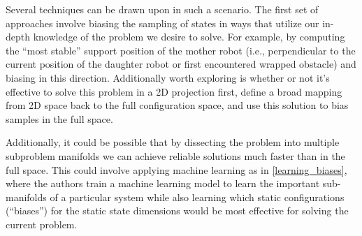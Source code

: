 \documentclass[12pt]{article}
\begin{document}
Several techniques can be drawn upon in such a scenario. The first set of approaches involve biasing the sampling of states 
in ways that utilize our in-depth knowledge of the problem we desire to solve. For example, by computing the ``most stable'' support 
position of the mother robot (i.e., perpendicular to the current position of the daughter robot or first encountered wrapped obstacle) 
and biasing in this direction. Additionally worth exploring is whether or not it's effective to solve this problem in 
a 2D projection first, define a broad mapping from 2D space back to the full configuration space, and use this solution to bias samples
in the full space. 

Additionally, it could be possible that by dissecting the problem into multiple subproblem manifolds we can achieve reliable 
solutions much faster than in the full space. This could involve applying machine learning as in \ref{learning_biases}, where the authors 
train a machine learning model to learn the important sub-manifolds of a particular system while also learning which static 
configurations (``biases'') for the static state dimensions would be most effective for solving the current problem. 









\newpage

\small{}

\end{document}
